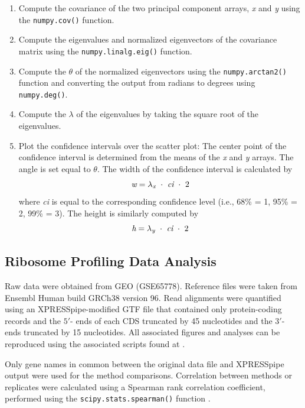 \documentclass[10pt, oneside]{article}
\begin{document}
\begin{multicols}{2}
\begin{enumerate}
  \item Compute the covariance of the two principal component arrays, \textit{x} and \textit{y} using the \texttt{numpy.cov()} function.

  \item Compute the eigenvalues and normalized eigenvectors of the covariance matrix using the \texttt{numpy.linalg.eig()} function.

  \item Compute the $\theta$ of the normalized eigenvectors using the \texttt{numpy.arctan2()} function and converting the output from radians to degrees using \texttt{numpy.deg()}.

  \item Compute the $\lambda$ of the eigenvalues by taking the square root of the eigenvalues.

  \item Plot the confidence intervals over the scatter plot: The center point of the confidence interval is determined from the means of the \textit{x} and \textit{y} arrays. The angle is set equal to $\theta$. The width of the confidence interval is calculated by
  \[
  \textit{w} = \lambda _{\textit{\scriptsize{x}}}\ \cdot\ \textit{ci}\ \cdot\ 2
  \]
  where \textit{ci} is equal to the corresponding confidence level (i.e., 68\% = 1, 95\% = 2, 99\% = 3). The height is similarly computed by
  \[
  \textit{h} = \lambda _{\textit{\scriptsize{y}}}\ \cdot\ \textit{ci}\ \cdot\ 2
  \]
\end{enumerate}

\subsection*{Ribosome Profiling Data Analysis}
Raw data were obtained from GEO (GSE65778). Reference files were taken from Ensembl Human build GRCh38 version 96. Read alignments were quantified using an XPRESSpipe-modified GTF file that contained only protein-coding records and the $5'$- ends of each CDS truncated by 45 nucleotides and the $3'$- ends truncated by 15 nucleotides. All associated figures and analyses can be reproduced using the associated scripts found at \cite{manuscript}. \par

Only gene names in common between the original data file and XPRESSpipe output were used for the method comparisons. Correlation between methods or replicates were calculated using a Spearman rank correlation coefficient, performed using the \texttt{scipy.stats.spearman()} function \cite{spearman_rnaseq}. \par


\end{multicols}
\end{document}

